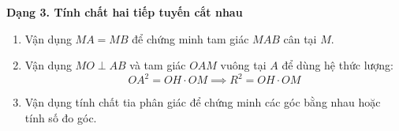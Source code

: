 \textbf{Dạng 3. Tính chất hai tiếp tuyến cắt nhau}
\begin{enumerate}
\item Vận dụng $MA = MB$ để chứng minh tam giác $MAB$ cân tại $M$.
\item Vận dụng $MO \perp AB$ và tam giác $OAM$ vuông tại $A$ để dùng hệ thức lượng:
$$OA^2 = OH \cdot OM \implies \boxed{R^2 = OH \cdot OM}$$
\item Vận dụng tính chất tia phân giác để chứng minh các góc bằng nhau hoặc tính số đo góc.
\end{enumerate}
